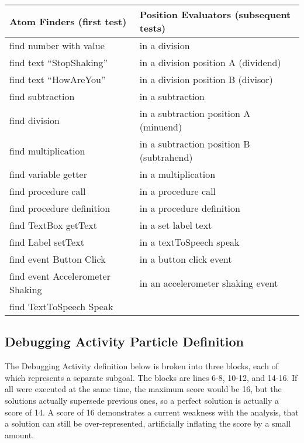\begin{table}
\begin{centering}
    \begin{tabular}{l l}
        Atom Finders (first test)           & Position Evaluators (subsequent tests) \\ \hline
        find number with value              & in a division \\
        find text ``StopShaking''           & in a division position A  (dividend)  \\
        find text ``HowAreYou''             & in a division position B  (divisor)   \\
        find subtraction                    & in a subtraction  \\
        find division                       & in a subtraction position A (minuend) \\
        find multiplication                 & in a subtraction position B (subtrahend)  \\
        find variable getter                & in a multiplication   \\
        find procedure call                 & in a procedure call   \\
        find procedure definition           & in a procedure definition \\
        find TextBox getText                & in a set label text   \\
        find Label setText                  & in a textToSpeech speak   \\
        find event Button Click             & in a button click event   \\
        find event Accelerometer Shaking    & in an accelerometer shaking event     \\
        find TextToSpeech Speak             &   \\

    \end{tabular}
    \label{tab:particle-tests}
\end{centering}
\end{table}

\subsection{Debugging Activity Particle Definition}
The Debugging Activity definition below %
is broken into three blocks, each of which represents a separate subgoal. The blocks are lines 6-8, 10-12, and 14-16. If all were executed at the same time, the maximum score would be 16, but the solutions actually supersede previous ones, so a perfect solution is actually a score of 14. A score of 16 demonstrates a current weakness with the analysis, that a solution can still be over-represented, artificially inflating the score by a small amount.

